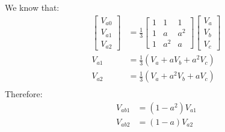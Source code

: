 We know that:
\begin{align}
    \begin{bmatrix}
        V_{a0} \\
        V_{a1} \\
        V_{a2}
    \end{bmatrix} &= \frac{1}{3}\begin{bmatrix}
        1 & 1   & 1   \\
        1 & a   & a^2   \\
        1 & a^2 & a
    \end{bmatrix}\begin{bmatrix}
        V_{a}\\
        V_{b}\\
        V_{c}
    \end{bmatrix}\\
    V_{a1} &= \frac{1}{3}\left(V_a+aV_b+a^2V_c\right)\\
    V_{a2} &= \frac{1}{3}\left(V_a+a^2V_b+aV_c\right)\\
\end{align}
Therefore:
\begin{align}
    V_{ab1} &= \left(1-a^2\right)V_{a1}\\
    V_{ab2} &= \left(1-a\right)V_{a2}
\end{align}
